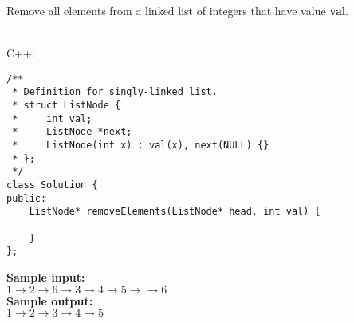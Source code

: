 \documentclass[a4paper]{article}
\begin{document}
Remove all elements from a linked list of integers that have value \textbf{val}.

\ \\

\noindent C++:

\begin{lstlisting}[style=C++]
/**
 * Definition for singly-linked list.
 * struct ListNode {
 *     int val;
 *     ListNode *next;
 *     ListNode(int x) : val(x), next(NULL) {}
 * };
 */
class Solution {
public:
    ListNode* removeElements(ListNode* head, int val) {
        
    }
};
\end{lstlisting}

\LINE

\noindent \textbf{Sample input:}\\
$1 \rightarrow 2 \rightarrow 6 \rightarrow 3 \rightarrow 4 \rightarrow 5 \rightarrow \rightarrow 6$\\

\noindent \textbf{Sample output:}\\
$1 \rightarrow 2 \rightarrow 3 \rightarrow 4 \rightarrow 5$\\
\end{document}
